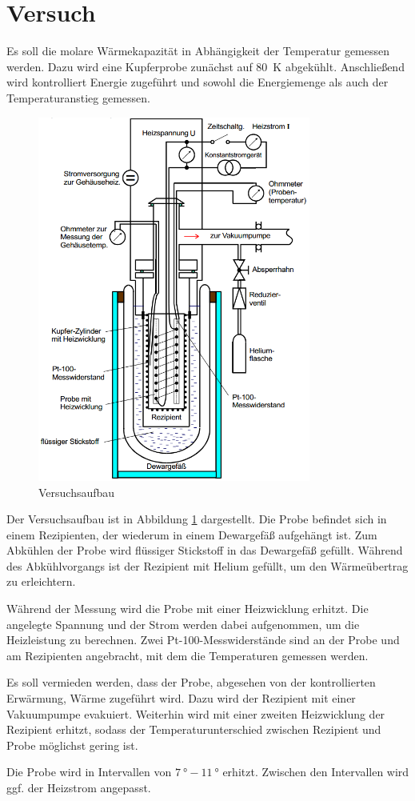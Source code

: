\section{Versuch}

Es soll die molare Wärmekapazität in Abhängigkeit der Temperatur gemessen werden.
Dazu wird eine Kupferprobe zunächst auf \SI{80}{\kelvin} abgekühlt.
Anschließend wird kontrolliert Energie zugeführt und sowohl die Energiemenge als auch der Temperaturanstieg gemessen.

\begin{figure}
	\centering
	\includegraphics[width=0.8\textwidth]{img/aufbau.png}
	\caption{Versuchsaufbau \cite{v47}}
	\label{fig:aufbau}
\end{figure}

Der Versuchsaufbau ist in Abbildung \ref{fig:aufbau} dargestellt. Die Probe befindet sich in einem Rezipienten, der wiederum in einem Dewargefäß aufgehängt ist.
Zum Abkühlen der Probe wird flüssiger Stickstoff in das Dewargefäß gefüllt.
Während des Abkühlvorgangs ist der Rezipient mit Helium gefüllt, um den Wärmeübertrag zu erleichtern.

Während der Messung wird die Probe mit einer Heizwicklung erhitzt.
Die angelegte Spannung und der Strom werden dabei aufgenommen, um die Heizleistung zu berechnen.
Zwei Pt-100-Messwiderstände sind an der Probe und am Rezipienten angebracht, mit dem die Temperaturen gemessen werden.

Es soll vermieden werden, dass der Probe, abgesehen von der kontrollierten Erwärmung, Wärme zugeführt wird.
Dazu wird der Rezipient mit einer Vakuumpumpe evakuiert.
Weiterhin wird mit einer zweiten Heizwicklung der Rezipient erhitzt, sodass der Temperaturunterschied zwischen Rezipient und Probe möglichst gering ist.

Die Probe wird in Intervallen von $\SI{7}{\degree} - \SI{11}{\degree}$ erhitzt.
Zwischen den Intervallen wird ggf. der Heizstrom angepasst.